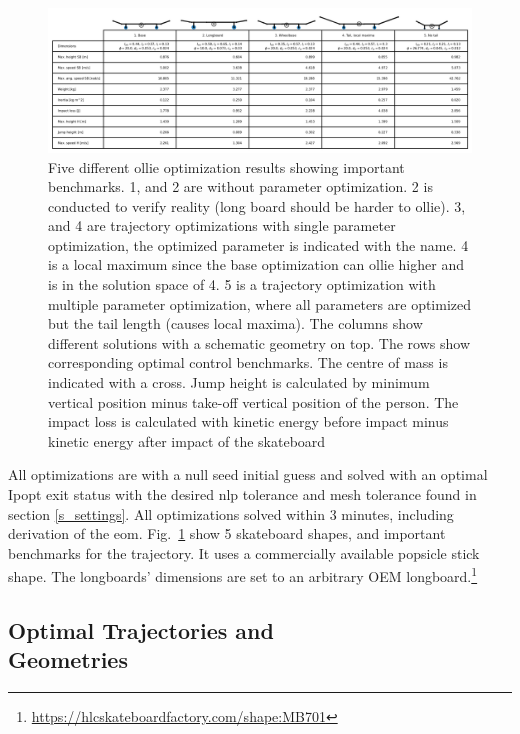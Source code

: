 \documentclass[default,iicol]{sn-jnl}
\begin{document}
\begin{figure}
    \centering
    \includegraphics[width=\textwidth]{paper/figure/Results/ResultsTable.png}
    \caption[Results benchmarks]{Five different ollie optimization results showing important benchmarks. 1, and 2 are without parameter optimization. 2 is conducted to verify reality (long board should be harder to ollie). 3, and 4 are trajectory optimizations with single parameter optimization, the optimized parameter is indicated with the name. 4 is a local maximum since the base optimization can ollie higher and is in the solution space of 4. 5 is a trajectory optimization with multiple parameter optimization, where all parameters are optimized but the tail length (causes local maxima). The columns show different solutions with a schematic geometry on top. The rows show corresponding optimal control benchmarks. The centre of mass is indicated with a cross. Jump height is calculated by minimum vertical position minus take-off vertical position of the person. The impact loss is calculated with kinetic energy before impact minus kinetic energy after impact of the skateboard}
    \label{fig:resultstable}
\end{figure}

All optimizations are with a null seed initial guess and solved with an optimal Ipopt exit status with the desired \gls{nlp} tolerance and mesh tolerance found in section \ref{s_settings}. All optimizations solved within 3 minutes, including derivation of the \gls{eom}. Fig.~\ref{fig:resultstable} show 5 skateboard shapes, and important benchmarks for the trajectory. It uses a commercially available popsicle stick shape. The longboards' dimensions are set to an arbitrary OEM longboard.\footnote{\url{https://hlcskateboardfactory.com/shape:MB701}}

\subsection{Optimal Trajectories and \\Geometries}
\end{document}
